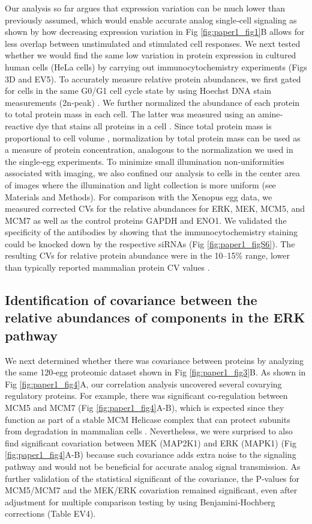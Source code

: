 Our analysis so far argues that expression variation can be much lower than previously assumed, which would enable accurate analog single‐cell signaling as shown by how decreasing expression variation in Fig \ref{fig:paper1_fig1}B allows for less overlap between unstimulated and stimulated cell responses. We next tested whether we would find the same low variation in protein expression in cultured human cells (HeLa cells) by carrying out immunocytochemistry experiments (Figs 3D and EV5). To accurately measure relative protein abundances, we first gated for cells in the same G0/G1 cell cycle state by using Hoechst DNA stain measurements (2n‐peak) \cite{Cappell2016}. We further normalized the abundance of each protein to total protein mass in each cell. The latter was measured using an amine‐reactive dye that stains all proteins in a cell \cite{Kafri2013}. Since total protein mass is proportional to cell volume \cite{Grover2011}, normalization by total protein mass can be used as a measure of protein concentration, analogous to the normalization we used in the single‐egg experiments. To minimize small illumination non‐uniformities associated with imaging, we also confined our analysis to cells in the center area of images where the illumination and light collection is more uniform (see Materials and Methods). For comparison with the Xenopus egg data, we measured corrected CVs for the relative abundances for ERK, MEK, MCM5, and MCM7 as well as the control proteins GAPDH and ENO1. We validated the specificity of the antibodies by showing that the immunocytochemistry staining could be knocked down by the respective siRNAs (Fig \ref{fig:paper1_figS6}). The resulting CVs for relative protein abundance were in the 10–15\% range, lower than typically reported mammalian protein CV values \cite{Sigal2006,Niepel2009,Gaudet2012}.

\subsection{Identification of covariance between the relative abundances of components in the ERK pathway}

We next determined whether there was covariance between proteins by analyzing the same 120‐egg proteomic dataset shown in Fig \ref{fig:paper1_fig3}B. As shown in Fig \ref{fig:paper1_fig4}A, our correlation analysis uncovered several covarying regulatory proteins. For example, there was significant co‐regulation between MCM5 and MCM7 (Fig \ref{fig:paper1_fig4}A-B), which is expected since they function as part of a stable MCM Helicase complex that can protect subunits from degradation in mammalian cells \cite{McShane2016}. Nevertheless, we were surprised to also find significant covariation between MEK (MAP2K1) and ERK (MAPK1) (Fig \ref{fig:paper1_fig4}A-B) because such covariance adds extra noise to the signaling pathway and would not be beneficial for accurate analog signal transmission. As further validation of the statistical significant of the covariance, the P‐values for MCM5/MCM7 and the MEK/ERK covariation remained significant, even after adjustment for multiple comparison testing by using Benjamini‐Hochberg corrections (Table EV4).

